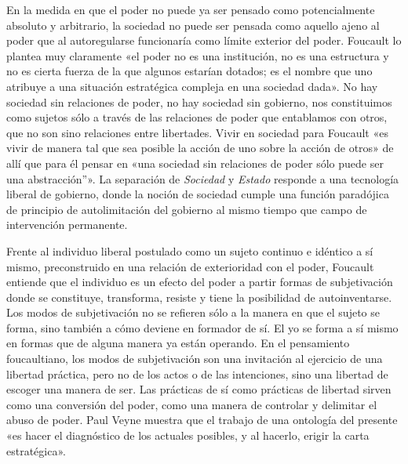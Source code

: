 En la medida en que el poder no puede ya ser pensado como potencialmente absoluto y arbitrario, la sociedad no puede ser pensada como aquello ajeno al poder que al autoregularse funcionaría como límite exterior del poder. Foucault lo plantea muy claramente «el poder no es una institución, no es una estructura y no es cierta fuerza de la que algunos estarían dotados; es el nombre que uno atribuye a una situación estratégica compleja en una sociedad dada». No hay sociedad sin relaciones de poder, no hay sociedad sin gobierno, nos constituimos como sujetos sólo a través de las relaciones de poder que entablamos con otros, que no son sino relaciones entre libertades. Vivir en sociedad para Foucault «es vivir de manera tal que sea posible la acción de uno sobre la acción de otros» de allí que para él pensar en «una sociedad sin relaciones de poder sólo puede ser una abstracción''». La separación de \emph{Sociedad} y \emph{Estado} responde a una tecnología liberal de gobierno, donde la noción de sociedad cumple una función paradójica de principio de autolimitación del gobierno al mismo tiempo que campo de intervención permanente.

Frente al individuo liberal postulado como un sujeto continuo e idéntico a sí mismo, preconstruido en una relación de exterioridad con el poder, Foucault entiende que el individuo es un efecto del poder a partir formas de subjetivación donde se constituye, transforma, resiste y tiene la posibilidad de autoinventarse. Los modos de subjetivación no se refieren sólo a la manera en que el sujeto se forma, sino también a cómo deviene en formador de sí. El yo se forma a sí mismo en formas que de alguna manera ya están operando. En el pensamiento foucaultiano, los modos de subjetivación son una invitación al ejercicio de una libertad práctica, pero no de los actos o de las intenciones, sino una libertad de escoger una manera de ser. Las prácticas de sí como prácticas de libertad sirven como una conversión del poder, como una manera de controlar y delimitar el abuso de poder. Paul Veyne muestra que el trabajo de una ontología del presente «es hacer el diagnóstico de los actuales posibles, y al hacerlo, erigir la carta estratégica».

